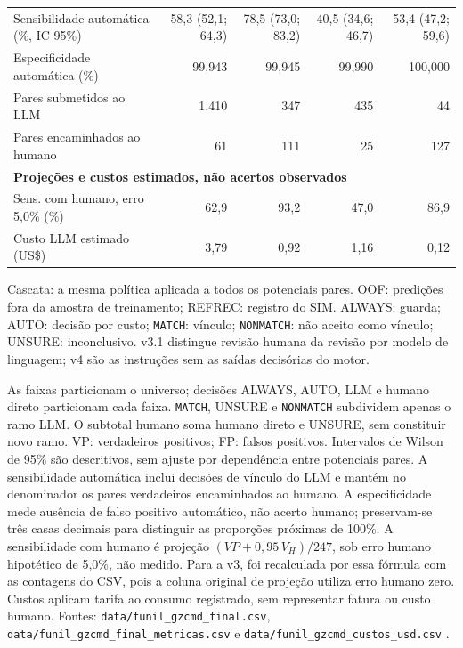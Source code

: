 \begin{longtable}{lrrrr}
Sensibilidade automática (\%, IC 95\%) & 58,3 (52,1; 64,3) & 78,5 (73,0; 83,2) & 40,5 (34,6; 46,7) & 53,4 (47,2; 59,6) \\
Especificidade automática (\%) & 99,943 & 99,945 & 99,990 & 100,000 \\
Pares submetidos ao LLM & 1.410 & 347 & 435 & 44 \\
Pares encaminhados ao humano & 61 & 111 & 25 & 127 \\
\hline
\multicolumn{5}{l}{\textbf{Projeções e custos estimados, não acertos observados}} \\
Sens. com humano, erro 5,0\% (\%) & 62,9 & 93,2 & 47,0 & 86,9 \\
Custo LLM estimado (US\$) & 3,79 & 0,92 & 1,16 & 0,12 \\
\end{longtable}
\par\footnotesize Cascata: a mesma política aplicada a todos os potenciais pares. OOF: predições fora da amostra de treinamento; REFREC: registro do SIM. ALWAYS: guarda; AUTO: decisão por custo; \texttt{MATCH}: vínculo; \texttt{NONMATCH}: não aceito como vínculo; UNSURE: inconclusivo. v3.1 distingue revisão humana da revisão por modelo de linguagem; v4 são as instruções sem as saídas decisórias do motor.

\noindent\parbox{\linewidth}{\footnotesize As faixas particionam o universo; decisões ALWAYS, AUTO, LLM e humano direto particionam cada faixa. \texttt{MATCH}, UNSURE e \texttt{NONMATCH} subdividem apenas o ramo LLM. O subtotal humano soma humano direto e UNSURE, sem constituir novo ramo. VP: verdadeiros positivos; FP: falsos positivos. Intervalos de Wilson de 95\% são descritivos, sem ajuste por dependência entre potenciais pares. A sensibilidade automática inclui decisões de vínculo do LLM e mantém no denominador os pares verdadeiros encaminhados ao humano. A especificidade mede ausência de falso positivo automático, não acerto humano; preservam-se três casas decimais para distinguir as proporções próximas de 100\%. A sensibilidade com humano é projeção $(VP+0{,}95\,V_H)/247$, sob erro humano hipotético de 5,0\%, não medido. Para a v3, foi recalculada por essa fórmula com as contagens do CSV, pois a coluna original de projeção utiliza erro humano zero. Custos aplicam tarifa ao consumo registrado, sem representar fatura ou custo humano. Fontes: \texttt{data/funil\_gzcmd\_final.csv}, \texttt{data/funil\_gzcmd\_final\_metricas.csv} e \texttt{data/funil\_gzcmd\_custos\_usd.csv} \cite{Jardim2026phdrepo}.}
\endgroup
